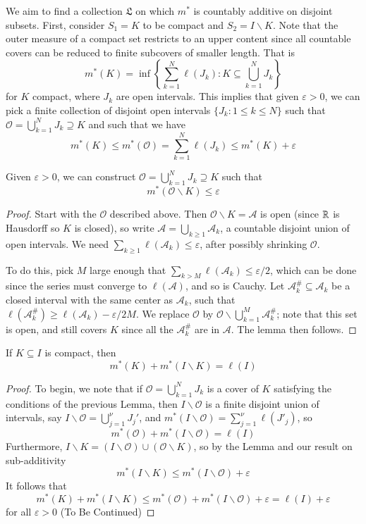 We aim to find a collection $\mathfrak{L}$ on which $m^*$ is countably additive on disjoint subsets. First, consider $S_1 = K$ to be compact and $S_2 = I\backslash K$. Note that the outer measure of a compact set restricts to an upper content since all countable covers can be reduced to finite subcovers of smaller length. That is $$m^*(K) = \inf\left\{\sum_{k=1}^N\ell(J_k):K\subseteq \bigcup_{k=1}^NJ_k\right\}$$ for $K$ compact, where $J_k$ are open intervals. This implies that given $\varepsilon > 0$, we can pick a finite collection of disjoint open intervals $\{J_k:1\leq k \leq N\}$ such that $\mathcal{O} = \bigcup_{k=1}^NJ_k\supseteq K$ and such that we have $$m^*(K) \leq m^*(\mathcal{O}) = \sum_{k=1}^N\ell(J_k)\leq m^*(K)+\varepsilon$$

\begin{lemma}
    Given $\varepsilon > 0$, we can construct $\mathcal{O} = \bigcup_{k=1}^NJ_k \supseteq K$ such that $$m^*\left(\mathcal{O}\backslash K\right) \leq \varepsilon$$
\end{lemma}
\begin{proof}
    Start with the $\mathcal{O}$ described above. Then $\mathcal{O}\backslash K = \mathcal{A}$ is open (since $\mathbb R$ is Hausdorff so $K$ is closed), so write $\mathcal{A} = \bigcup_{k\geq 1}\mathcal{A}_k$, a countable disjoint union of open intervals. We need $\sum_{k\geq 1}\ell(\mathcal{A}_k) \leq \varepsilon$, after possibly shrinking $\mathcal{O}$.

    To do this, pick $M$ large enough that $\sum_{k > M}\ell(\mathcal{A}_k) \leq \varepsilon/2$, which can be done since the series must converge to $\ell(\mathcal{A})$, and so is Cauchy. Let $\mathcal{A}_k^{\#} \subseteq \mathcal{A}_k$ be a closed interval with the same center as $\mathcal{A}_k$, such that $\ell(\mathcal{A}_k^{\#}) \geq \ell(\mathcal{A}_k) - \varepsilon/2M$. We replace $\mathcal{O}$ by $\mathcal{O}\backslash\bigcup_{k=1}^M\mathcal{A}_k^{\#}$; note that this set is open, and still covers $K$ since all the $\mathcal{A}_k^{\#}$ are in $\mathcal{A}$. The lemma then follows.
\end{proof}

\begin{proposition}
    If $K \subseteq I$ is compact, then $$m^*(K) + m^*(I\backslash K) = \ell(I)$$
\end{proposition}
\begin{proof}
    To begin, we note that if $\mathcal{O} = \bigcup_{k=1}^NJ_k$ is a cover of $K$ satisfying the conditions of the previous Lemma, then $I\backslash \mathcal{O}$ is a finite disjoint union of intervals, say $I \backslash\mathcal{O} = \bigcup_{j=1}^{\nu}J_j'$, and $m^*(I\backslash\mathcal{O}) = \sum_{j=1}^{\nu}\ell(J'_j)$, so $$m^*(\mathcal{O})+m^*(I\backslash\mathcal{O}) = \ell(I)$$
    Furthermore, $I\backslash K = (I\backslash\mathcal{O}) \cup(\mathcal{O}\backslash K)$, so by the Lemma and our result on sub-additivity $$m^*(I\backslash K) \leq m^*(I\backslash\mathcal{O}) + \varepsilon$$ 
    It follows that $$m^*(K) + m^*(I\backslash K) \leq m^*(\mathcal{O}) + m^*(I\backslash \mathcal{O}) + \varepsilon = \ell(I)+\varepsilon$$
    for all $\varepsilon > 0$ (To Be Continued)
\end{proof}

